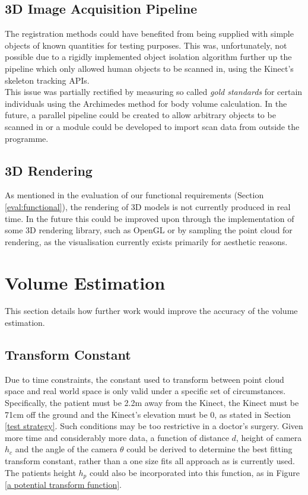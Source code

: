 \subsection{3D Image Acquisition Pipeline}
The registration methods could have benefited from being supplied with simple objects of known quantities for testing purposes. This was, unfortunately, not possible due to a rigidly implemented object isolation algorithm further up the pipeline which only allowed human objects to be scanned in, using the Kinect's skeleton tracking APIs. \\

This issue was partially rectified by measuring so called \emph{gold standards} for certain individuals using the Archimedes method for body volume calculation. In the future, a parallel pipeline could be created to allow arbitrary objects to be scanned in or a module could be developed to import scan data from outside the programme. \\

\subsection{3D Rendering}
As mentioned in the evaluation of our functional requirements (Section \ref{eval:functional}), the rendering of 3D models is not currently produced in real time. In the future this could be improved upon through the implementation of some 3D rendering library, such as OpenGL or by sampling the point cloud for rendering, as the visualisation currently exists primarily for aesthetic reasons. \\

\section{Volume Estimation}
This section details how further work would improve the accuracy of the volume estimation.\\

\subsection{Transform Constant}
\label{transform constant}
Due to time constraints, the constant used to transform between point cloud space and real world space is only valid under a specific set of circumstances. Specifically, the patient must be 2.2m away from the Kinect, the Kinect must be 71cm off the ground and the Kinect's elevation must be 0, as stated in Section \ref{test strategy}. Such conditions may be too restrictive in a doctor's surgery. Given more time and considerably more data, a function of distance $d$, height of camera $h_c$ and the angle of the camera $\theta$ could be derived to determine the best fitting transform constant, rather than a one size fits all approach as is currently used. The patients height $h_p$ could also be incorporated into this function, as in Figure \ref{a potential transform function}.\\

